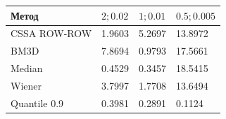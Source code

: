 \begin{tabular}{|l|l|l|l|}
\hline
Метод & $2; 0.02$ & $1; 0.01$ & $0.5; 0.005$ \\
\hline
CSSA ROW-ROW & 1.9603 & 5.2697 & 13.8972 \\
\hline
BM3D & 7.8694 & 0.9793 & 17.5661 \\
\hline
Median & 0.4529 & 0.3457 & 18.5415 \\
\hline
Wiener & 3.7997 & 1.7708 & 13.6494 \\
\hline
Quantile 0.9 & 0.3981 & 0.2891 & 0.1124 \\
\hline
\end{tabular}
